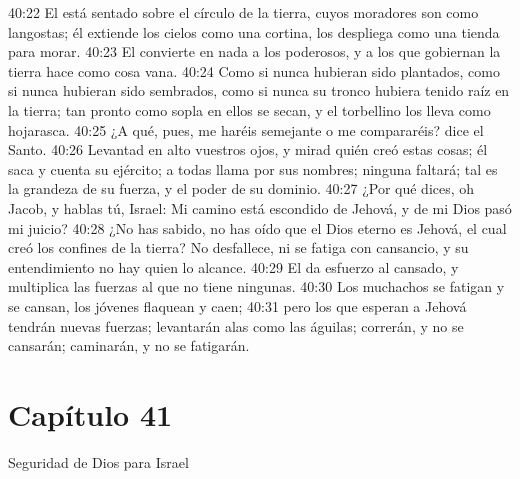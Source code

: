 40:22 El está sentado sobre el círculo de la tierra, cuyos moradores son como langostas; él extiende los cielos como una cortina, los despliega como una tienda para morar. 
40:23 El convierte en nada a los poderosos, y a los que gobiernan la tierra hace como cosa vana. 
40:24 Como si nunca hubieran sido plantados, como si nunca hubieran sido sembrados, como si nunca su tronco hubiera tenido raíz en la tierra; tan pronto como sopla en ellos se secan, y el torbellino los lleva como hojarasca. 
40:25 ¿A qué, pues, me haréis semejante o me compararéis? dice el Santo. 
40:26 Levantad en alto vuestros ojos, y mirad quién creó estas cosas; él saca y cuenta su ejército; a todas llama por sus nombres; ninguna faltará; tal es la grandeza de su fuerza, y el poder de su dominio. 
40:27 ¿Por qué dices, oh Jacob, y hablas tú, Israel: Mi camino está escondido de Jehová, y de mi Dios pasó mi juicio? 
40:28 ¿No has sabido, no has oído que el Dios eterno es Jehová, el cual creó los confines de la tierra? No desfallece, ni se fatiga con cansancio, y su entendimiento no hay quien lo alcance. 
40:29 El da esfuerzo al cansado, y multiplica las fuerzas al que no tiene ningunas. 
40:30 Los muchachos se fatigan y se cansan, los jóvenes flaquean y caen; 
40:31 pero los que esperan a Jehová tendrán nuevas fuerzas; levantarán alas como las águilas; correrán, y no se cansarán; caminarán, y no se fatigarán. 
\section*{Capítulo 41 }
Seguridad de Dios para Israel 
 
